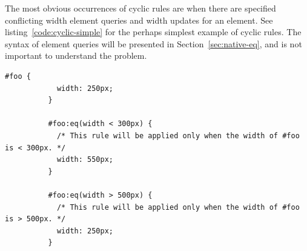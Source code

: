 \documentclass[a4paper,11pt]{kth-mag}
\begin{document}
        The most obvious occurrences of cyclic rules are when there are specified conflicting width element queries and width updates for an \gls{element}.
        See listing~\ref{code:cyclic-simple} for the perhaps simplest example of cyclic rules.
        The syntax of element queries will be presented in Section~\ref{sec:native-eq}, and is not important to understand the problem.
        \begin{lstlisting}[gobble=10,caption={Simple example of cyclic rules with directly conflicting width element queries and updates.}, captionpos=b, label={code:cyclic-simple}]
          #foo {
            width: 250px;
          }

          #foo:eq(width < 300px) {
            /* This rule will be applied only when the width of #foo is < 300px. */
            width: 550px;
          }

          #foo:eq(width > 500px) {
            /* This rule will be applied only when the width of #foo is > 500px. */
            width: 250px;
          }
        \end{lstlisting}
\end{document}
